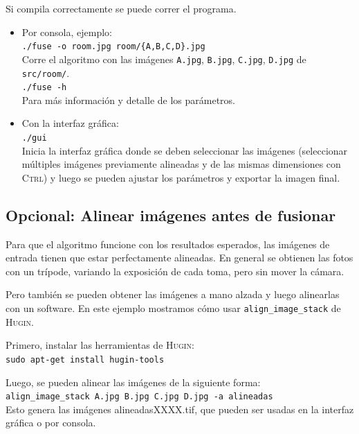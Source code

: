 \documentclass[a4paper,10pt]{article}
\begin{document}
        Si compila correctamente se puede correr el programa.
        \begin{itemize}
        \item Por consola, ejemplo:\\
          \texttt{./fuse -o room.jpg room/\{A,B,C,D\}.jpg}\\
          Corre el algoritmo con las imágenes \texttt{A.jpg}, \texttt{B.jpg}, \texttt{C.jpg}, \texttt{D.jpg} de \texttt{src/room/}.\\
          \texttt{./fuse -h}\\
          Para más información y detalle de los parámetros.
        \item Con la interfaz gráfica:\\
          \texttt{./gui}\\
          Inicia la interfaz gráfica donde se deben seleccionar las imágenes (seleccionar múltiples imágenes previamente alineadas y de las mismas dimensiones con \textsc{Ctrl}) y luego se pueden ajustar los parámetros y exportar la imagen final.
        \end{itemize}
        
        \subsection{Opcional: Alinear imágenes antes de fusionar}
            Para que el algoritmo funcione con los resultados esperados, las imágenes de entrada tienen que estar perfectamente alineadas.
            En general se obtienen las fotos con un trípode, variando la exposición de cada toma, pero sin mover la cámara.
            
            Pero también se pueden obtener las imágenes a mano alzada y luego alinearlas con un software. En este ejemplo mostramos cómo usar \texttt{align\_image\_stack} de \textsc{Hugin}.
            
            Primero, instalar las herramientas de \textsc{Hugin}:\\
            \texttt{sudo apt-get install hugin-tools}
            
            Luego, se pueden alinear las imágenes de la siguiente forma:\\
            \texttt{align\_image\_stack A.jpg B.jpg C.jpg D.jpg -a alineadas}\\
            Esto genera las imágenes alineadasXXXX.tif, que pueden ser usadas en la interfaz gráfica o por consola.

    \appendix
\end{document}
